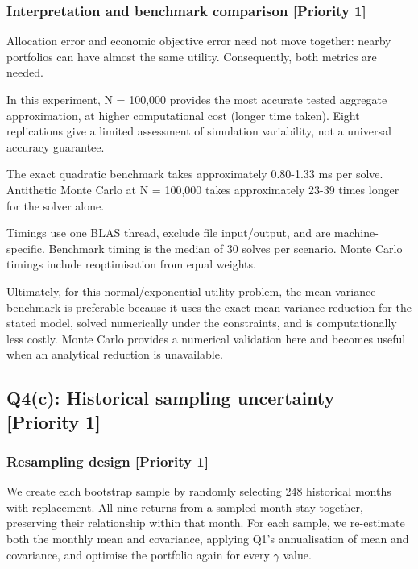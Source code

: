 \documentclass[
  10pt,
  a4paper,
]{article}
\begin{document}
\hypertarget{interpretation-and-benchmark-comparison-priority-1}{%
\subsubsection{Interpretation and benchmark comparison {[}Priority
1{]}}\label{interpretation-and-benchmark-comparison-priority-1}}

Allocation error and economic objective error need not move together:
nearby portfolios can have almost the same utility. Consequently, both
metrics are needed.

In this experiment, N = 100,000 provides the most accurate tested
aggregate approximation, at higher computational cost (longer time
taken). Eight replications give a limited assessment of simulation
variability, not a universal accuracy guarantee.

The exact quadratic benchmark takes approximately 0.80-1.33 ms per
solve. Antithetic Monte Carlo at N = 100,000 takes approximately 23-39
times longer for the solver alone.

Timings use one BLAS thread, exclude file input/output, and are
machine-specific. Benchmark timing is the median of 30 solves per
scenario. Monte Carlo timings include reoptimisation from equal weights.

Ultimately, for this normal/exponential-utility problem, the
mean-variance benchmark is preferable because it uses the exact
mean-variance reduction for the stated model, solved numerically under
the constraints, and is computationally less costly. Monte Carlo
provides a numerical validation here and becomes useful when an
analytical reduction is unavailable.

\hypertarget{q4c-historical-sampling-uncertainty-priority-1}{%
\subsection{Q4(c): Historical sampling uncertainty {[}Priority
1{]}}\label{q4c-historical-sampling-uncertainty-priority-1}}

\hypertarget{resampling-design-priority-1}{%
\subsubsection{Resampling design {[}Priority
1{]}}\label{resampling-design-priority-1}}

We create each bootstrap sample by randomly selecting 248 historical
months with replacement. All nine returns from a sampled month stay
together, preserving their relationship within that month. For each
sample, we re-estimate both the monthly mean and covariance, applying
Q1's annualisation of mean and covariance, and optimise the portfolio
again for every \(\gamma\) value.
\end{document}
